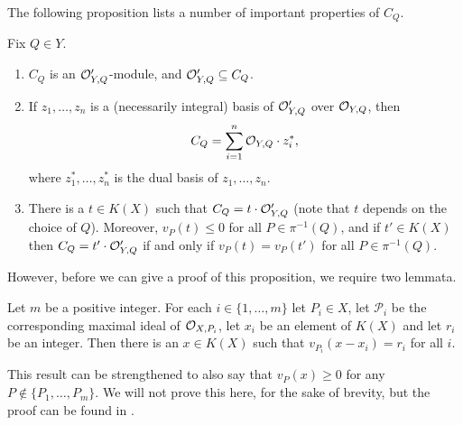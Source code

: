 The following proposition lists a number of important properties of $C_Q$.

\begin{prop}\label{propfactsaboutc'}
    Fix $Q\in Y$. 
        \begin{enumerate}
        \item $C_Q$ is an ${\cal O}_{Y,Q}'$-module, and ${\cal O}_{Y,Q}' \subseteq C_Q$.
        \item If $z_1,\ldots ,z_n$ is a (necessarily integral) basis of ${\cal O}_{Y,Q}'$ over ${\cal O}_{Y,Q}$, then 
        \[
        C_Q = \sum_{i=1}^n {\cal O}_{Y,Q}\cdot z_i^*,
        \]
        where $z_1^*, \ldots, z_n^*$ is the dual basis of $z_1, \ldots, z_n$.
        \item There is a $t\in K(X)$ such that $C_Q = t\cdot {\cal O}_{Y,Q}'$ (note that $t$ depends on the choice of $Q$).
        Moreover, $v_P(t) \leq 0$ for all $P\in \pi^{-1}(Q)$, and if $t'\in K(X)$ then $C_Q=t'\cdot {\cal O}_{Y,Q}'$ if and only if $v_P(t) = v_P(t')$ for all $P\in \pi^{-1}(Q)$.
        \end{enumerate}
    \end{prop}

However, before we can give a proof of this proposition, we require two lemmata.

    \begin{lem}\label{lemmaapproximationlemma}
    Let $m$ be a positive integer. 
    For each $i\in \{1,\ldots, m\}$ let $P_i\in X$, let $\mathcal{P}_i$ be the corresponding maximal ideal of ${\cal O}_{X,P_i}$, let $x_i$ be an element of $K(X)$ and let $r_i$ be an integer.
    Then there is an $x\in K(X)$ such that $v_{P_i}(x-x_i) = r_i$ for all $i$.
    \end{lem}
    
    \begin{rem}
    This result can be strengthened to also say that $v_P(x) \geq 0$ for any $P\notin \{P_1,\ldots ,P_m\}$.
    We will not prove this here, for the sake of brevity, but the proof can be found in \cite[Chap. 1, \S 3, pg. 12]{localfields}.
    \end{rem}

